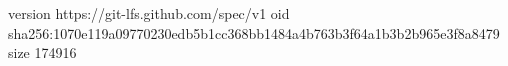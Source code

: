 version https://git-lfs.github.com/spec/v1
oid sha256:1070e119a09770230edb5b1cc368bb1484a4b763b3f64a1b3b2b965e3f8a8479
size 174916
